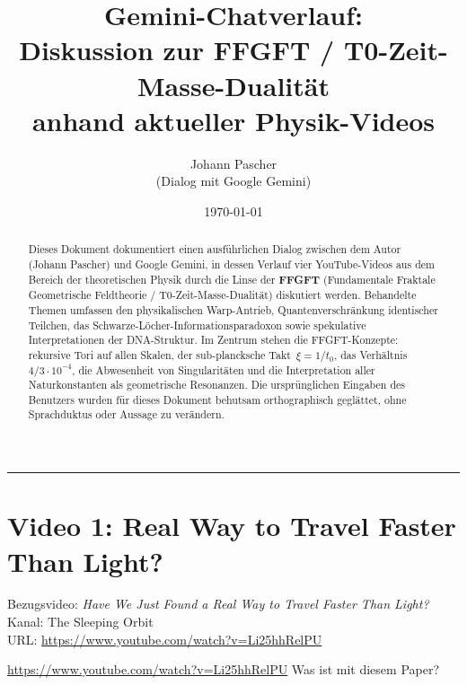 \documentclass[11pt,a4paper]{article}
\title{Gemini-Chatverlauf:\\
\large Diskussion zur FFGFT / T0-Zeit-Masse-Dualit\"at\\
\normalsize anhand aktueller Physik-Videos}
\author{Johann Pascher \\ \small (Dialog mit Google Gemini)}
\date{\today}
\begin{document}
\maketitle

\begin{abstract}
\noindent
Dieses Dokument dokumentiert einen ausf\"uhrlichen Dialog zwischen dem Autor (Johann Pascher) und Google Gemini, in dessen Verlauf vier YouTube-Videos aus dem Bereich der theoretischen Physik durch die Linse der \textbf{FFGFT} (Fundamentale Fraktale Geometrische Feldtheorie / T0-Zeit-Masse-Dualit\"at) diskutiert werden. Behandelte Themen umfassen den \glqq physikalischen\grqq{} Warp-Antrieb, Quantenverschr\"ankung identischer Teilchen, das Schwarze-L\"ocher-Informationsparadoxon sowie spekulative Interpretationen der DNA-Struktur. Im Zentrum stehen die FFGFT-Konzepte: rekursive Tori auf allen Skalen, der sub-plancksche Takt~$\xi = 1/t_0$, das Verh\"altnis~$4/3 \cdot 10^{-4}$, die Abwesenheit von Singularit\"aten und die Interpretation aller Naturkonstanten als geometrische Resonanzen. Die urspr\"unglichen Eingaben des Benutzers wurden f\"ur dieses Dokument behutsam orthographisch gegl\"attet, ohne Sprachduktus oder Aussage zu ver\"andern.
\end{abstract}

\tableofcontents
\bigskip
\hrule
\bigskip

\section{Video 1: \glqq Real Way to Travel Faster Than Light?\grqq}

\begin{videobox}
Bezugsvideo: \emph{Have We Just Found a Real Way to Travel Faster Than Light?} \\
Kanal: The Sleeping Orbit \\
URL: \url{https://www.youtube.com/watch?v=Li25hhRelPU}
\end{videobox}

\begin{userbox}
\url{https://www.youtube.com/watch?v=Li25hhRelPU} \quad Was ist mit diesem Paper?
\end{userbox}
\end{document}
